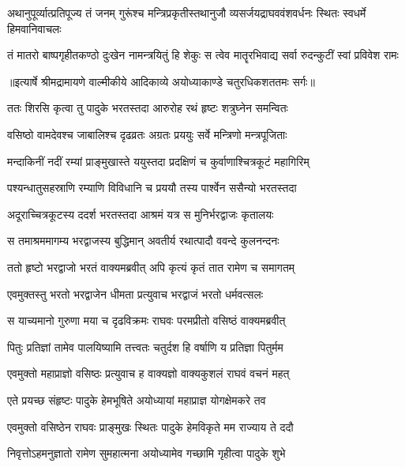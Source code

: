 \fourlineindentedshloka
{अथानुपूर्व्यात्प्रतिपूज्य तं जनम्}
{गुरूंश्च मन्त्रिप्रकृतीस्तथानुजौ}
{व्यसर्जयद्राघववंशवर्धनः}
{स्थितः स्वधर्मे हिमवानिवाचलः} %

\fourlineindentedshloka
{तं मातरो बाष्पगृहीतकण्ठो}
{दुःखेन नामन्त्रयितुं हि शेकुः}
{स त्वेव मातॄरभिवाद्य सर्वा}
{रुदन्कुटीं स्वां प्रविवेश रामः} %


{॥इत्यार्षे श्रीमद्रामायणे वाल्मीकीये आदिकाव्ये अयोध्याकाण्डे चतुरधिकशततमः सर्गः॥}


\twolineshloka
{ततः शिरसि कृत्वा तु पादुके भरतस्तदा}
{आरुरोह रथं हृष्टः शत्रुघ्नेन समन्वितः} %

\twolineshloka
{वसिष्ठो वामदेवश्च जाबालिश्च दृढव्रतः}
{अग्रतः प्रययुः सर्वे मन्त्रिणो मन्त्रपूजिताः} %

\twolineshloka
{मन्दाकिनीं नदीं रम्यां प्राङ्मुखास्ते ययुस्तदा}
{प्रदक्षिणं च कुर्वाणाश्चित्रकूटं महागिरिम्} %

\twolineshloka
{पश्यन्धातुसहस्राणि रम्याणि विविधानि च}
{प्रययौ तस्य पार्श्वेन ससैन्यो भरतस्तदा} %

\twolineshloka
{अदूराच्चित्रकूटस्य ददर्श भरतस्तदा}
{आश्रमं यत्र स मुनिर्भरद्वाजः कृतालयः} %

\twolineshloka
{स तमाश्रममागम्य भरद्वाजस्य बुद्धिमान्}
{अवतीर्य रथात्पादौ ववन्दे कुलनन्दनः} %

\twolineshloka
{ततो हृष्टो भरद्वाजो भरतं वाक्यमब्रवीत्}
{अपि कृत्यं कृतं तात रामेण च समागतम्} %

\twolineshloka
{एवमुक्तस्तु भरतो भरद्वाजेन धीमता}
{प्रत्युवाच भरद्वाजं भरतो धर्मवत्सलः} %

\twolineshloka
{स याच्यमानो गुरुणा मया च दृढविक्रमः}
{राघवः परमप्रीतो वसिष्ठं वाक्यमब्रवीत्} %

\twolineshloka
{पितुः प्रतिज्ञां तामेव पालयिष्यामि तत्त्वतः}
{चतुर्दश हि वर्षाणि य प्रतिज्ञा पितुर्मम} %

\twolineshloka
{एवमुक्तो महाप्राज्ञो वसिष्ठः प्रत्युवाच ह}
{वाक्यज्ञो वाक्यकुशलं राघवं वचनं महत्} %

\twolineshloka
{एते प्रयच्छ संहृष्टः पादुके हेमभूषिते}
{अयोध्यायां महाप्राज्ञ योगक्षेमकरे तव} %

\twolineshloka
{एवमुक्तो वसिष्ठेन राघवः प्राङ्मुखः स्थितः}
{पादुके हेमविकृते मम राज्याय ते ददौ} %

\twolineshloka
{निवृत्तोऽहमनुज्ञातो रामेण सुमहात्मना}
{अयोध्यामेव गच्छामि गृहीत्वा पादुके शुभे} %


